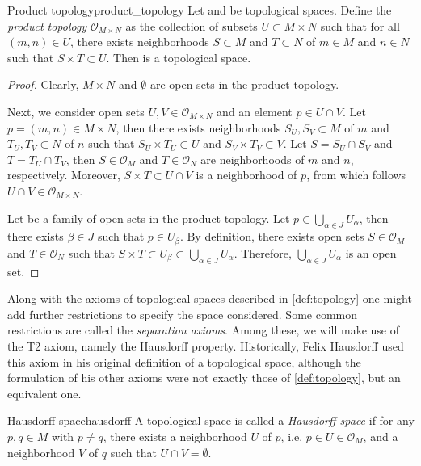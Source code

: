 \begin{proposition}{Product topology}{product_topology}
    Let  and  be topological spaces. Define the \emph{product topology} \(\mathcal{O}_{M\times N}\) as the collection of subsets \(U \subset M \times N\) such that for all \((m,n) \in U\), there exists neighborhoods \(S \subset M\) and \(T \subset N\) of \(m \in M\) and \(n\in N\) such that \(S \times T \subset U\). Then  is a topological space.
\end{proposition}
\begin{proof}
    Clearly, \(M\times N\) and \(\emptyset\) are open sets in the product topology.

    Next, we consider open sets \(U, V \in \mathcal{O}_{M\times N}\) and an element \(p \in U \cap V\). Let \(p = (m, n) \in M \times N\), then there exists neighborhoods \(S_U, S_V\subset M\) of \(m\) and \(T_U, T_V \subset N\) of \(n\) such that \(S_U \times T_U \subset U\) and \(S_V \times T_V \subset V\). Let \(S = S_U \cap S_V\) and \(T = T_U \cap T_V\), then \(S \in \mathcal{O}_M\) and \(T \in \mathcal{O}_N\) are neighborhoods of \(m\) and \(n\), respectively. Moreover, \(S \times T \subset U \cap V\) is a neighborhood of \(p\), from which follows \(U \cap V \in \mathcal{O}_{M\times N}\).

    Let  be a family of open sets in the product topology. Let \(p\in \bigcup_{\alpha\in J}U_\alpha\), then there exists \(\beta \in J\) such that \(p \in U_{\beta}\). By definition, there exists open sets \(S \in \mathcal{O}_M\) and \(T \in \mathcal{O}_N\) such that \(S \times T \subset U_\beta \subset \bigcup_{\alpha\in J} U_\alpha\). Therefore, \(\bigcup_{\alpha\in J}U_\alpha\) is an open set.
\end{proof}

Along with the axioms of topological spaces described in \cref{def:topology} one might add further restrictions to specify the space considered. Some common restrictions are called the \emph{separation axioms}. Among these, we will make use of the T2 axiom, namely the Hausdorff property. Historically, Felix Hausdorff used this axiom in his original definition of a topological space, although the formulation of his other axioms were not exactly those of \cref{def:topology}, but an equivalent one.
\begin{definition}{Hausdorff space}{hausdorff}
    A topological space  is called a \emph{Hausdorff space} if for any \(p,q\in M\) with \(p\neq q\), there exists a neighborhood \(U\) of \(p\), i.e. \(p \in U \in \mathcal{O}_M\), and a neighborhood \(V\) of \(q\) such that \(U \cap V = \emptyset\).
\end{definition}
